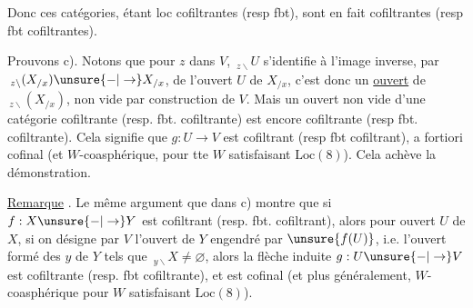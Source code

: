 Donc ces catégories, étant loc cofiltrantes (resp fbt),
sont en fait cofiltrantes (resp fbt cofiltrantes).

Prouvons c). Notons que pour $z$ dans $V$,
$\,{}_{z\backslash}U$ s'identifie à l'image inverse, par $\,{}_{z\backslash}(X_{/x})\unsure{-|\to}X_{/x}$,
de l'ouvert $U$ de $X_{/x}$, c'est donc un
\uline{ouvert} de $\,{}_{z\backslash}(X_{/x})$, non vide par construction
de $V$. Mais un ouvert non vide d'une
catégorie cofiltrante (resp. fbt. cofiltrante)
est encore cofiltrante (resp fbt. cofiltrante).
Cela signifie que $g:U\longrightarrow V$ est cofiltrant
(resp fbt cofiltrant), a fortiori cofinal
(et $W$-coasphérique, pour tte $W$ satisfaisant
$\mathrm{Loc}(8)$). Cela achève la démonstration.

\uline{Remarque} . Le même argument que dans
c) montre que si $f:X\unsure{-|\to}Y$ est
cofiltrant (resp. fbt. cofiltrant), alors
pour  ouvert $U$ de $X$, si on
désigne par $V$ l'ouvert de $Y$  engendré
par $\unsure{f(U)}$, i.e. l'ouvert formé des $y$
de $Y$ tels que $\,{}_{y\backslash}X\ne\varnothing$, alors la
flèche induite $g:U\unsure{-|\to}V$ est cofiltrante
(resp. fbt cofiltrante), et 
est cofinal (et plus généralement, 
$W$-coasphérique pour  $W$ satisfaisant
 $\mathrm{Loc}(8)$).
